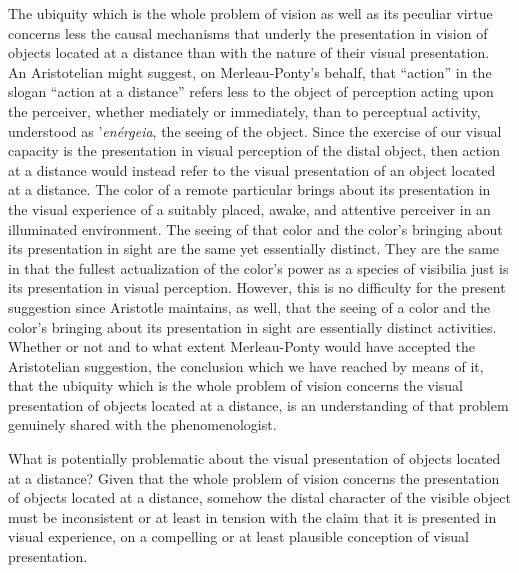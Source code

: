 \documentclass[12pt]{article}
\begin{document}
The ubiquity which is the whole problem of vision as well as its peculiar virtue concerns less the causal mechanisms that underly the presentation in vision of objects located at a distance than with the nature of their visual presentation. An Aristotelian might suggest, on Merleau-Ponty's behalf, that ``action'' in the slogan ``action at a distance'' refers less to the object of perception acting upon the perceiver, whether mediately or immediately, than to perceptual activity, understood as '\emph{en\'{e}rgeia}, the seeing of the object. Since the exercise of our visual capacity is the presentation in visual perception of the distal object, then action at a distance would instead refer to the visual presentation of an object located at a distance. The color of a remote particular brings about its presentation in the visual experience of a suitably placed, awake, and attentive perceiver in an illuminated environment. The seeing of that color and the color's bringing about its presentation in sight are the same yet essentially distinct. They are the same in that the fullest actualization of the color's power as a species of visibilia just is its presentation in visual perception. However, this is no difficulty for the present suggestion since Aristotle maintains, as well, that the seeing of a color and the color's bringing about its presentation in sight are essentially distinct activities. Whether or not and to what extent Merleau-Ponty would have accepted the Aristotelian suggestion, the conclusion which we have reached by means of it, that the ubiquity which is the whole problem of vision concerns the visual presentation of objects located at a distance, is an understanding of that problem genuinely shared with the phenomenologist.


What is potentially problematic about the visual presentation of objects located at a distance? Given that the whole problem of vision concerns the presentation of objects located at a distance, somehow the distal character of the visible object must be inconsistent or at least in tension with the claim that it is presented in visual experience, on a compelling or at least plausible conception of visual presentation. 
\end{document}
